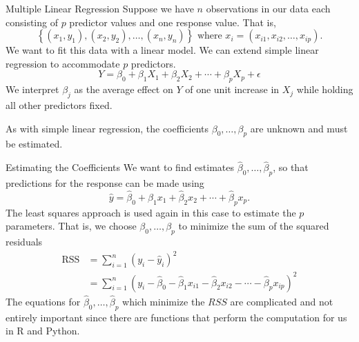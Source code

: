 \documentclass[
  ignorenonframetext,
  aspectratio=169,
]{beamer}
\begin{document}
\begin{frame}{Multiple Linear Regression}
\protect\hypertarget{multiple-linear-regression}{}
Suppose we have \(n\) observations in our data each consisting of \(p\)
predictor values and one response value. That is, \[
\left\{\left(x_{1}, y_{1}\right),\left(x_{2}, y_{2}\right), \ldots,\left(x_{n}, y_{n}\right)\right\} \text { where } x_{i}=\left(x_{i 1}, x_{i 2}, \ldots, x_{i p}\right).
\] We want to fit this data with a linear model. We can extend simple
linear regression to accommodate \(p\) predictors. \[
Y=\beta_{0}+\beta_{1} X_{1}+\beta_{2} X_{2}+\cdots+\beta_{p} X_{p}+\epsilon
\]
\alert{We interpret $\beta_j$ as the average effect on $Y$ of one unit increase in $X_j$ while holding all other predictors fixed.}

As with simple linear regression, the coefficients
\(\beta_0, \dots, \beta_p\) are unknown and must be estimated.
\end{frame}

\begin{frame}{Estimating the Coefficients}
\protect\hypertarget{estimating-the-coefficients-1}{}
We want to find estimates \(\hat \beta_0, \dots, \hat \beta_p\), so that
predictions for the response can be made using \[
\hat{y}=\hat{\beta}_{0}+\hat{\beta}_{1} x_{1}+\hat{\beta}_{2} x_{2}+\cdots+\hat{\beta}_{p} x_{p}.
\] The least squares approach is used again in this case to estimate the
\(p\) parameters. That is, we choose \(\beta_0, \dots, \beta_p\) to
minimize the sum of the squared residuals \[
\begin{aligned}
\mathrm{RSS} &=\sum_{i=1}^{n}\left(y_{i}-\hat{y}_{i}\right)^{2} \\
&=\sum_{i=1}^{n}\left(y_{i}-\hat{\beta}_{0}-\hat{\beta}_{1} x_{i 1}-\hat{\beta}_{2} x_{i 2}-\cdots-\hat{\beta}_{p} x_{i p}\right)^{2}
\end{aligned}
\] The equations for \(\hat \beta_0, \dots, \hat \beta_p\) which
minimize the \(RSS\) are complicated and not entirely important since
there are functions that perform the computation for us in R and Python.
\end{frame}
\end{document}
